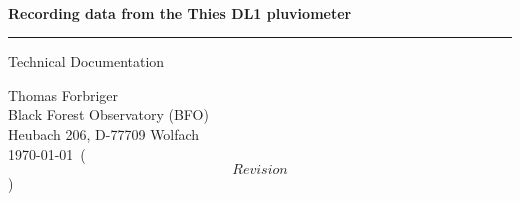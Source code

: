 \documentclass[twoside]{article}
\newcommand{\mytitle}{Recording data from the Thies DL1 pluviometer}
\begin{document}
\mbox{ }\par
\vspace{-1.5cm}
\medskip
{\noindent\Large\textbf{\mytitle}\vspace{-14pt}\par}
\rule{\textwidth}{0.5pt}
\par
\vspace{-\parskip}
Technical Documentation
\hfill
\begin{raggedleft}
Thomas Forbriger\\
Black Forest Observatory (BFO)\\
Heubach 206,
D-77709 Wolfach\\
\vspace{3pt}
\today\ (\mbox{\texttt{$$Revision$$}})\\

\par
\end{raggedleft}
\bigskip
\thispagestyle{plain}
\end{document}
